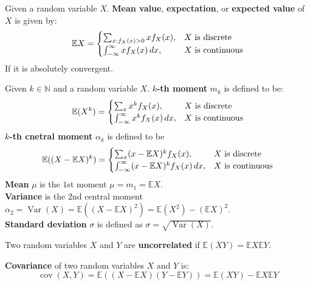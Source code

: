 \documentclass{huhtakm-template-book}
\newcommand{\expect}{\mathbb{E}}
\DeclareMathOperator{\Var}{Var}
\DeclareMathOperator{\cov}{cov}
\begin{document}
    \begin{sdefn}
        Given a random variable $X$. \textbf{Mean value}, \textbf{expectation}, or \textbf{expected value} of $X$ is given by:
        \begin{equation*}
            \expect X=\begin{cases}
                \sum_{x:f_{X}(x)>0}xf_{X}(x), &X\text{ is discrete}\\
                \intinfty xf_{X}(x)\,dx, &X\text{ is continuous}
            \end{cases}
        \end{equation*}
        If it is absolutely convergent.
    \end{sdefn}
    \begin{sdefn}
        Given $k\in\mathbb{N}$ and a random variable $X$. \textbf{$k$-th moment} $m_{k}$ is defined to be:
        \begin{equation*}
            \expect(X^{k})=\begin{cases}
                \sum_{x}x^{k}f_{X}(x), &X\text{ is discrete}\\
                \intinfty x^{k}f_{X}(x)\,dx, &X\text{ is continuous}
            \end{cases}
        \end{equation*}
        \textbf{$k$-th cnetral moment} $\alpha_{k}$ is defined to be
        \begin{equation*}
            \expect((X-\expect X)^{k})=\begin{cases}
                \sum_{x}(x-\expect X)^{k}f_{X}(x), &X\text{ is discrete}\\
                \intinfty(x-\expect X)^{k}f_{X}(x)\,dx, &X\text{ is continuous}
            \end{cases}
        \end{equation*}
        \textbf{Mean} $\mu$ is the $1$st moment $\mu=m_{1}=\expect X$.\\
        \textbf{Variance} is the $2$nd central moment $\alpha_{2}=\Var(X)=\expect((X-\expect X)^{2})=\expect(X^{2})-(\expect X)^{2}$.\\
        \textbf{Standard deviation} $\sigma$ is defined as $\sigma=\sqrt{\Var(X)}$.
    \end{sdefn}
    \begin{sdefn}
        Two random variables $X$ and $Y$ are \textbf{uncorrelated} if $\expect(XY)=\expect X\expect Y$.
    \end{sdefn}
    \begin{sdefn}
        \textbf{Covariance} of two random variables $X$ and $Y$ is:
        \begin{equation*}
            \cov(X,Y)=\expect((X-\expect X)(Y-\expect Y))=\expect(XY)-\expect X\expect Y
        \end{equation*}
    \end{sdefn}
\end{document}
